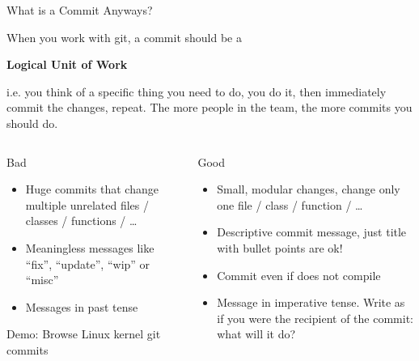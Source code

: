 \documentclass[xetex]{beamer}
\begin{document}
\begin{frame}{What is a Commit Anyways?}

  When you work with git, a commit should be a
  \begin{center}
    \Large \bfseries
    Logical Unit of Work
  \end{center}
  i.e. you think of a specific thing you need to do, you do it, then
  immediately commit the changes, repeat. The more people in the team, the more
  commits you should do.

  \begin{columns}[t]
    \begin{column}{.5\linewidth}
      \begin{alertblock}{Bad} \footnotesize
        \begin{itemize}
          \item Huge commits that change multiple unrelated files / classes / functions / \ldots
          \item Meaningless messages like ``fix'', ``update'', ``wip'' or ``misc''
          \item Messages in past tense
        \end{itemize}
      \end{alertblock}

      \footnotesize
      Demo: Browse Linux kernel git commits
    \end{column}
    \begin{column}{.5\linewidth}
      \begin{block}{Good} \footnotesize
        \begin{itemize}
          \item Small, modular changes, change only one file / class / function / \ldots
          \item Descriptive commit message, just title with bullet points are ok!
          \item Commit even if does not compile
          \item Message in imperative tense. Write as if you were the recipient
            of the commit: what will it do?
        \end{itemize}
      \end{block}
    \end{column}
  \end{columns}
\end{frame}
\end{document}
